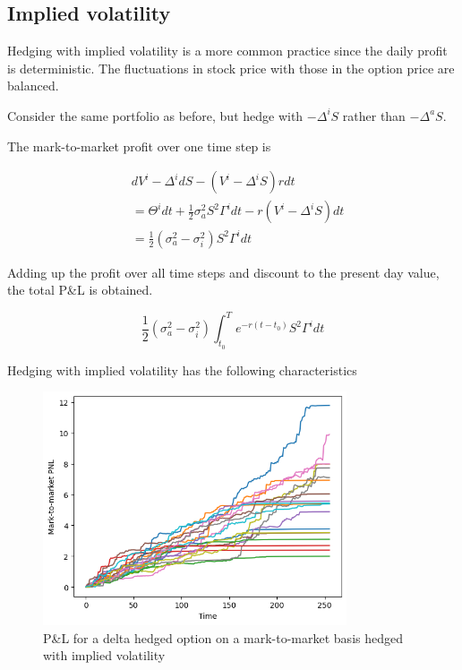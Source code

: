 \documentclass{article}
\newcommand{\para}{\vspace{8pt}} %
\begin{document}
\subsection{Implied volatility}

Hedging with implied volatility is a more common practice since the daily profit is deterministic. The fluctuations in stock price with those in the option price are balanced.

\para
Consider the same portfolio as before, but hedge with $-\Delta^i S$ rather than $-\Delta^a S$. 

\para
The mark-to-market profit over one time step is

\begin{center}
\begin{align*}
& dV^i - \Delta^i dS -(V^i - \Delta^i S) rdt\\[2pt]
&= \Theta^i dt + \frac{1}{2} \sigma_a^2 S^2 \Gamma^i dt - r(V^i - \Delta^i S) dt\\[2pt]
&= \frac{1}{2}(\sigma_a^2 - \sigma_i^2) S^2 \Gamma^i dt
\end{align*}
\end{center}

Adding up the profit over all time steps and discount to the present day value, the total P\&L is obtained.

\[
    \frac{1}{2}(\sigma_a^2 - \sigma_i^2) \int_{t_0}^{T} e^{-r(t-t_0)} S^2 \Gamma^i dt
\]

Hedging with implied volatility has the following characteristics 

\begin{figure}[h]
    \centering
    \includegraphics[width=0.8\textwidth]{images/implied_volatility_hedging.png}
    \caption{P\&L for a delta hedged option on a mark-to-market basis hedged with implied volatility}
    \label{fig:implied_volatility_hedging}
\end{figure}
\end{document}
